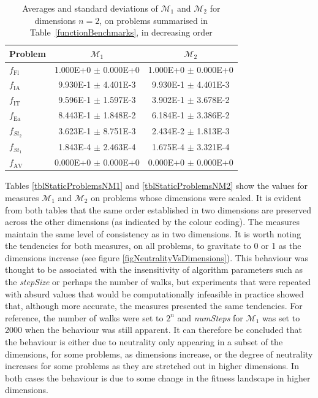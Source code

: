 \documentclass[conference]{IEEEtran}
\begin{document}
\begin{table}[!t] 
	\renewcommand{\arraystretch}{1.3}
	\caption{Averages and standard deviations of ${\mathcal{M}_1}$ and ${\mathcal{M}_2}$ for dimensions $n = 2$, on problems summarised in Table~\ref{functionBenchmarks}, in decreasing order}
	\label{tblStaticProblems2}
	\centering
	\begin{tabular}{|l|c|c|}
		\hline
		\textbf{Problem}					& ${\mathcal{M}_1}$ & ${\mathcal{M}_2}$ \\ \hline				
		$f_{\text{Fl}}$			& 1.000E+0 $\pm$ 0.000E+0 & 1.000E+0 $\pm$ 0.000E+0 \\
		$f_{\text{IA}}$			& 9.930E-1 $\pm$ 4.401E-3 & 9.930E-1 $\pm$ 4.401E-3 \\
		$f_{\text{IT}}$ 		& 9.596E-1 $\pm$ 1.597E-3 & 3.902E-1 $\pm$ 3.678E-2 \\
		$f_{\text{Ea}}$ 		& 8.443E-1 $\pm$ 1.848E-2 & 6.184E-1 $\pm$ 3.386E-2 \\
		$f_{\textit{St}_2}$ 	& 3.623E-1 $\pm$ 8.751E-3 & 2.434E-2 $\pm$ 1.813E-3 \\
		$f_{\textit{St}_1}$ 	& 1.843E-4 $\pm$ 2.463E-4 & 1.675E-4 $\pm$ 3.321E-4 \\
		$f_{\text{AV}}$			& 0.000E+0 $\pm$ 0.000E+0 & 0.000E+0 $\pm$ 0.000E+0 \\  \hline		
	\end{tabular}
\end{table}

Tables \ref{tblStaticProblemsNM1} and \ref{tblStaticProblemsNM2} show the values for measures ${\mathcal{M}_1}$ and ${\mathcal{M}_2}$ on problems whose dimensions were scaled. It is evident from both tables that the same order established in two dimensions are preserved across the other dimensions (as indicated by the colour coding). The measures maintain the same level of consistency as in two dimensions. It is worth noting the tendencies for both measures, on all problems, to gravitate to 0 or 1 as the dimensions increase (see figure \ref{figNeutralityVsDimensions}). This behaviour was thought to be associated with the insensitivity of algorithm parameters such as the \textit{stepSize} or perhaps the number of walks, but experiments that were repeated with absurd values that would be computationally infeasible in practice showed that, although more accurate, the measures presented the same tendencies. For reference, the number of walks were set to $2^n$ and \textit{numSteps} for ${\mathcal{M}_1}$ was set to 2000 when the behaviour was still apparent. It can therefore be concluded that the behaviour is either due to neutrality only appearing in a subset of the dimensions, for some problems, as dimensions increase, or the degree of neutrality increases for some problems as they are stretched out in higher dimensions. In both cases the behaviour is due to some change in the fitness landscape in higher dimensions.
\end{document}
